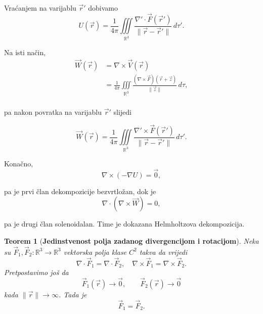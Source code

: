 \documentclass[12pt,a4paper]{article}
\makeatletter
\newtheorem{tm}{Teorem}[section]
\renewenvironment{proof}[1][\proofname]{\par
  \pushQED{\qed}%
  \normalfont
  \topsep6\p@\@plus6\p@\relax
  \trivlist
  \item[\hskip\labelsep
  \bfseries #1\@addpunct{.}]\ignorespaces
}{%
  \popQED\endtrivlist\@endpefalse
}
\makeatother
\begin{document}
\begin{proof}
Vraćanjem na varijablu \(\overrightarrow{r}'\) dobivamo
$$  U(\overrightarrow{r}) = \frac{1}{4\pi} \iiint\limits_{\mathbb{R}^3} \frac{\nabla'\cdot\overrightarrow{F}(\overrightarrow{r}')} {\|\overrightarrow{r}-\overrightarrow{r}'\|}\,d\tau'.  $$

Na isti način,
$$ \begin{aligned} \overrightarrow{W}(\overrightarrow{r}) &=\nabla\times\overrightarrow{V}(\overrightarrow{r})\\ &= \frac{1}{4\pi} \iiint\limits_{\mathbb{R}^3} \frac{(\nabla\times\overrightarrow{F})(\overrightarrow{r}+\overrightarrow{z})} {\|\overrightarrow{z}\|}\,d\tau, \end{aligned} $$\\
pa nakon povratka na varijablu \(\overrightarrow{r}'\) slijedi

$$  \overrightarrow{W}(\overrightarrow{r}) = \frac{1}{4\pi} \iiint\limits_{\mathbb{R}^3} \frac{\nabla'\times\overrightarrow{F}(\overrightarrow{r}')} {\|\overrightarrow{r}-\overrightarrow{r}'\|}\,d\tau'.  $$

Konačno,
$$ \nabla\times(-\nabla U)=\overrightarrow{0}, $$

pa je prvi član dekompozicije bezvrtložan, dok je
$$ \nabla\cdot(\nabla\times\overrightarrow{W})=0, $$

pa je drugi član solenoidalan. Time je dokazana Helmholtzova dekompozicija. \end{proof}


\begin{tm}[\textbf{Jedinstvenost polja zadanog divergencijom i rotacijom}]
    Neka su $ \overrightarrow{F}_1,\overrightarrow{F}_2:\mathbb{R}^3\to\mathbb{R}^3 $ vektorska polja klase \(C^2\) takva da vrijedi
$$ \nabla\cdot\overrightarrow{F}_1=\nabla\cdot\overrightarrow{F}_2,\quad \nabla\times\overrightarrow{F}_1=\nabla\times\overrightarrow{F}_2. $$
Pretpostavimo još da 
$$ \overrightarrow{F}_1(\overrightarrow{r})\to \overrightarrow{0}, \qquad \overrightarrow{F}_2(\overrightarrow{r})\to \overrightarrow{0} $$
kada \(\|\overrightarrow{r}\|\to\infty\). Tada je 
\[ \overrightarrow{F}_1=\overrightarrow{F}_2. \]
\end{tm}
\end{document}
